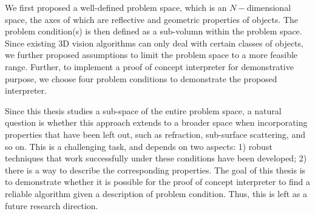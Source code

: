 We first proposed a well-defined problem space, which is an $N-$dimensional space, the axes of which are reflective and geometric properties of objects. The problem condition(s) is then defined as a sub-volumn within the problem space. Since existing 3D vision algorithms can only deal with certain classes of objects, we further proposed assumptions to limit the problem space to a more feasible range. Further, to implement a proof of concept interpreter for demonstrative purpose, we choose four problem conditions to demonstrate the proposed interpreter.

Since this thesis studies a sub-space of the entire problem space, a natural question is whether this approach extends to a broader space when incorporating properties that have been left out, such as refraction, sub-surface scattering, and so on. This is a challenging task, and depends on two aspects: 1) robust techniques that work successfully under these conditions have been developed; 2) there is a way to describe the corresponding properties. The goal of this thesis is to demonstrate whether it is possible for the proof of concept interpreter to find a reliable algorithm given a description of problem condition. Thus, this is left as a future research direction.
